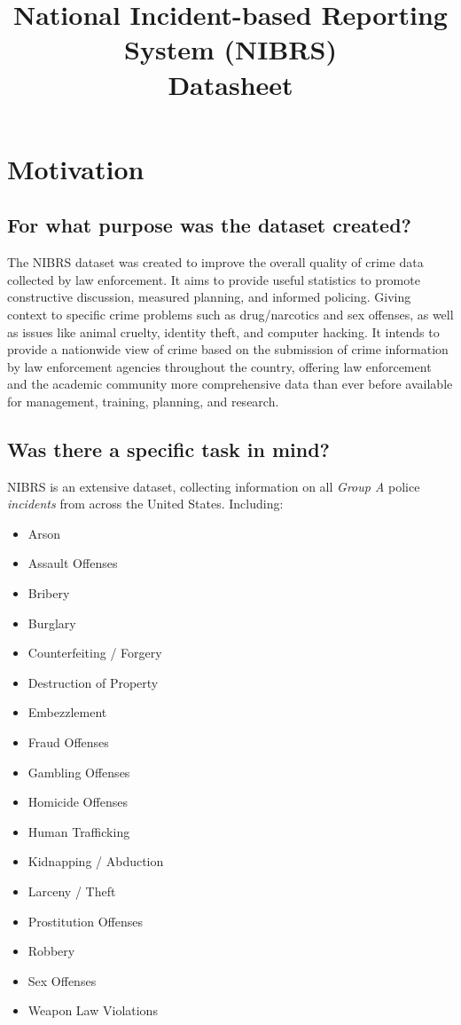 \documentclass[letterpaper, 10 pt, conference]{ieeeconf}  %
\title{\LARGE \bf
National Incident-based Reporting System (NIBRS) \\{\color{blue}Datasheet}
}
\begin{document}
\maketitle
\thispagestyle{empty}
\pagestyle{empty}

\section{Motivation}

\subsection{For what purpose was the dataset created?}

The NIBRS dataset was created to improve the overall quality of crime data collected by law enforcement. It aims to provide useful statistics to promote constructive discussion, measured planning, and informed policing. Giving context to specific crime problems such as drug/narcotics and sex offenses, as well as issues like animal cruelty, identity theft, and computer hacking. It intends to provide a nationwide view of crime based on the submission of crime information by law enforcement agencies throughout the country, offering law enforcement and the academic community more comprehensive data than ever before available for management, training, planning, and research. 

\subsection{Was there a specific task in mind?}

NIBRS is an extensive dataset, collecting information on all \textit{Group A} police \textit{incidents} from across the United States. Including:

\begin{itemize}
    \item Arson
    \item Assault Offenses
    \item Bribery
    \item Burglary
    \item Counterfeiting / Forgery
    \item Destruction of Property
    \item Embezzlement
    \item Fraud Offenses
    \item Gambling Offenses
    \item Homicide Offenses
    \item Human Trafficking
    \item Kidnapping / Abduction
    \item Larceny / Theft
    \item Prostitution Offenses
    \item Robbery
    \item Sex Offenses
    \item Weapon Law Violations
\end{itemize}
\end{document}
